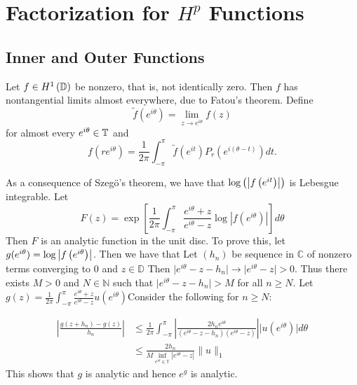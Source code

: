 \chapter{Factorization for \texorpdfstring{$H^p$}{} Functions}

\section{Inner and Outer Functions}
Let $f \in H^{1} \left( \mathbb D \right)$ be nonzero, that is, not identically zero.  Then $f$ has nontangential limits almost everywhere, due to Fatou's theorem. Define
\begin{equation*}
    \tilde{f} (e^{i\theta} ) = \lim_{z\to e^{i\theta}} f(z)
\end{equation*}
for almost every $e^{i\theta} \in \mathbb T$ and
\begin{equation*}
    f(re^{i\theta}) = \frac{1}{2\pi} \int_{-\pi}^{\pi} \tilde{f} \left( e^{it} \right) P_{r} \left( e^{i\left( \theta -t \right)} \right) dt.
\end{equation*}

As a consequence of Szegö's theorem, we have that $\log \left( \left\lvert f\left( e^{it} \right) \right\rvert \right)$ is Lebesgue integrable. Let
\begin{equation*}
  F(z) = \exp \left[ \frac{1}{2\pi} \int_{-\pi}^{\pi} \frac{e^{i\theta}+z}{e^{i\theta} - z} \log |f(e^{i\theta})| \right]  d\theta  
\end{equation*}
Then $F$ is an analytic function in the unit disc. To prove this, let $g(e^{i\theta}) = \log \left\lvert f\left( e^{i\theta} \right) \right\rvert$. Then we have that
Let $(h_n)$ be sequence in $\mathbb C$ of nonzero terms converging to $0$ and $z \in \mathbb D$ Then $\lvert e^{i\theta } - z - h_n \rvert \to \lvert e^{i\theta} - z \rvert > 0$. Thus there exists $M > 0$ and $N \in \mathbb N$ such that $\lvert e^{i\theta } - z - h_n \rvert > M$ for all $n \ge N$. Let $g(z)=\frac{1}{2\pi} \int_{-\pi}^{\pi} \frac{e^{i\theta}+z}{e^{i\theta} - z} u(e^{i\theta})$Consider the following for $n\ge N$:

\begin{align*}
\left\lvert \frac{g(z+h_n) - g(z)}{h_n} \right\rvert &\le \frac{1}{2\pi} \int_{-\pi}^{\pi} \left\lvert \frac{2h_n e^{i\theta}}{(e^{i\theta}-z-h_n)(e^{i\theta}-z)} \right\rvert \lvert u(e^{i\theta}) \rvert d\theta \\
&\le \frac{2h_n}{M \inf_{e^{i\theta} \in \mathbb T}{|e^{i\theta}-z|}} \lVert u \rVert_1
\end{align*}
This shows that $g$ is analytic and hence $e^g$ is analytic.

